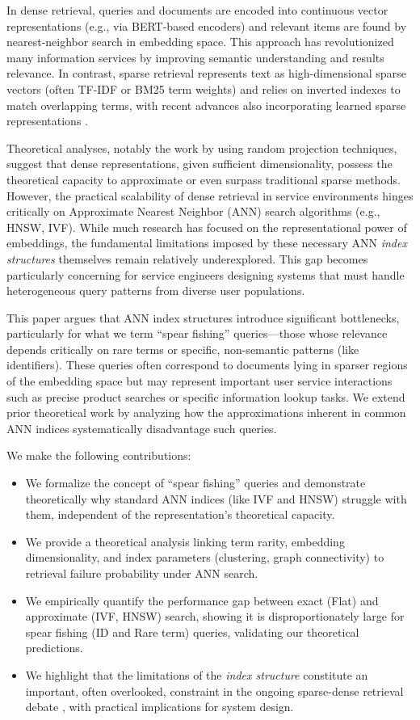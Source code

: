 \documentclass[manuscript]{acmart}
\begin{document}
In dense retrieval, queries and documents are encoded into continuous vector representations (e.g., via BERT-based encoders) and relevant items are found by nearest-neighbor search in embedding space. This approach has revolutionized many information services by improving semantic understanding and results relevance. In contrast, sparse retrieval represents text as high-dimensional sparse vectors (often TF-IDF or BM25 term weights) and relies on inverted indexes to match overlapping terms, with recent advances also incorporating learned sparse representations \cite{formal2021splade}.

Theoretical analyses, notably the work by \citet{tay2020sparse} using random projection techniques, suggest that dense representations, given sufficient dimensionality, possess the theoretical capacity to approximate or even surpass traditional sparse methods. However, the practical scalability of dense retrieval in service environments hinges critically on Approximate Nearest Neighbor (ANN) search algorithms (e.g., HNSW, IVF). While much research has focused on the representational power of embeddings, the fundamental limitations imposed by these necessary ANN \textit{index structures} themselves remain relatively underexplored. This gap becomes particularly concerning for service engineers designing systems that must handle heterogeneous query patterns from diverse user populations.

This paper argues that ANN index structures introduce significant bottlenecks, particularly for what we term ``spear fishing'' queries—those whose relevance depends critically on rare terms or specific, non-semantic patterns (like identifiers). These queries often correspond to documents lying in sparser regions of the embedding space but may represent important user service interactions such as precise product searches or specific information lookup tasks. We extend prior theoretical work \cite{tay2020sparse, fan2022information} by analyzing how the approximations inherent in common ANN indices systematically disadvantage such queries.

We make the following contributions:
\begin{itemize}
    \item We formalize the concept of ``spear fishing'' queries and demonstrate theoretically why standard ANN indices (like IVF and HNSW) struggle with them, independent of the representation's theoretical capacity.
    \item We provide a theoretical analysis linking term rarity, embedding dimensionality, and index parameters (clustering, graph connectivity) to retrieval failure probability under ANN search.
    \item We empirically quantify the performance gap between exact (Flat) and approximate (IVF, HNSW) search, showing it is disproportionately large for spear fishing (ID and Rare term) queries, validating our theoretical predictions.
    \item We highlight that the limitations of the \textit{index structure} constitute an important, often overlooked, constraint in the ongoing sparse-dense retrieval debate \cite{lin2024dense}, with practical implications for system design.
\end{itemize}
\end{document}
